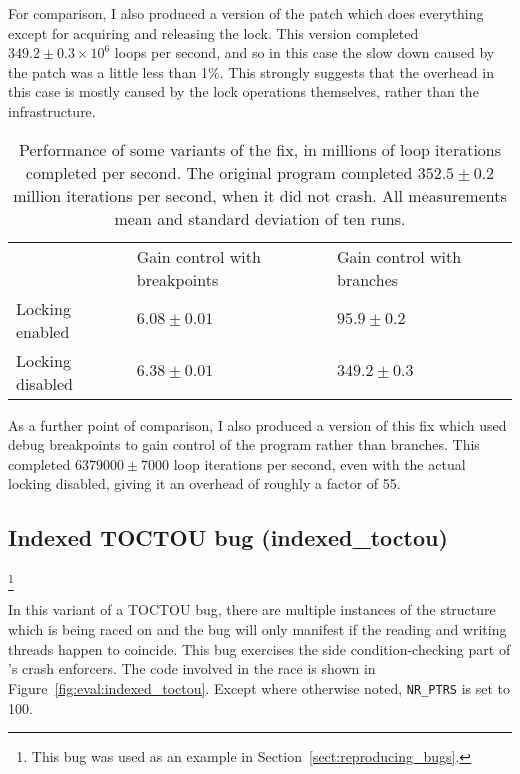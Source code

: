
For comparison, I also produced a version of the patch which does
everything except for acquiring and releasing the lock.  This version
completed $349.2 \pm 0.3 {\times} 10^6$ loops per second, and so in
this case the slow down caused by the patch was a little less than
1\%.  This strongly suggests that the overhead in this case is mostly
caused by the lock operations themselves, rather than the {\technique}
infrastructure.

\begin{table}
  \begin{tabular}{lll}
                     & Gain control with breakpoints & Gain control with branches \\
    Locking enabled  & $6.08 \pm 0.01$               & $95.9 \pm 0.2$\\
    Locking disabled & $6.38 \pm 0.01$               & $349.2 \pm 0.3$\\
  \end{tabular}
  \caption{Performance of some variants of the fix, in millions of
    loop iterations completed per second.  The original program
    completed $352.5 \pm 0.2$ million iterations per second, when it
    did not crash.  All measurements mean and standard deviation of
    ten runs.}
  \label{table:eval:simple_toctou:other_fixes}
\end{table}

As a further point of comparison, I also produced a version of this
fix which used debug breakpoints to gain control of the program rather
than branches.  This completed $6379000 \pm 7000$ loop iterations per
second, even with the actual locking disabled, giving it an overhead
of roughly a factor of 55.


\subsection{Indexed TOCTOU bug (indexed\_toctou)}\footnote{This bug was used as an example in Section~\ref{sect:reproducing_bugs}.}

\label{sect:eval:indexed_toctou}

In this variant of a TOCTOU bug, there are multiple instances of the
structure which is being raced on and the bug will only manifest if
the reading and writing threads happen to coincide.  This bug
exercises the side condition-checking part of {\technique}'s crash
enforcers.  The code involved in the race is shown in
Figure~\ref{fig:eval:indexed_toctou}.  Except where otherwise noted,
\verb|NR_PTRS| is set to 100.

